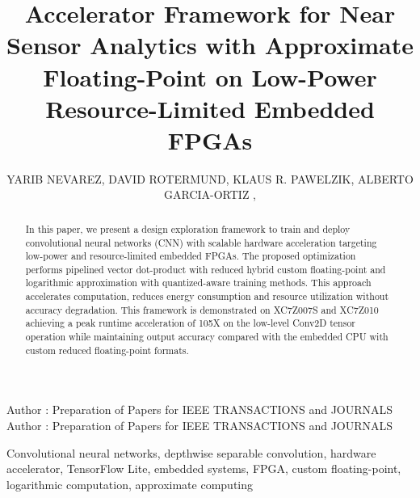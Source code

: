 \title {Accelerator Framework for Near Sensor Analytics with Approximate Floating-Point on Low-Power Resource-Limited Embedded FPGAs}

\author{
	\uppercase{Yarib Nevarez},	
	\uppercase{David Rotermund},
	\uppercase{Klaus R. Pawelzik},
	\uppercase{Alberto Garcia-Ortiz} ,
}

\address[1]{Institute of Electrodynamics and Microelectronics, University of Bremen, Bremen 28359, Germany (e-mail: nevarez@item.uni-bremen.de)}

\address[2]{Institute for Theoretical Physics, University of Bremen, Bremen 28359, Germany (e-mail: davrot@neuro.uni-bremen.de)}

\address[3]{Institute for Theoretical Physics, University of Bremen, Bremen 28359, Germany (e-mail: pawelzik@neuro.uni-bremen.de)}

\address[4]{Institute of Electrodynamics and Microelectronics, University of Bremen, Bremen 28359, Germany (e-mail: agarcia@item.uni-bremen.de)}


\markboth
{Author \headeretal: Preparation of Papers for IEEE TRANSACTIONS and JOURNALS}
{Author \headeretal: Preparation of Papers for IEEE TRANSACTIONS and JOURNALS}


\begin{abstract}
In this paper, we present a design exploration framework to train and deploy convolutional neural networks (CNN) with scalable hardware acceleration targeting low-power and resource-limited embedded FPGAs. The proposed optimization performs pipelined vector dot-product with reduced hybrid custom floating-point and logarithmic approximation with quantized-aware training methods. This approach accelerates computation, reduces energy consumption and resource utilization without accuracy degradation. This framework is demonstrated on XC7Z007S and  XC7Z010 achieving a peak runtime acceleration of 105X on the low-level Conv2D tensor operation while maintaining output accuracy compared with the embedded CPU with custom reduced floating-point formats.	
\end{abstract}

\begin{keywords}
Convolutional neural networks, depthwise separable convolution, hardware accelerator, TensorFlow Lite, embedded systems, FPGA, custom floating-point, logarithmic computation, approximate computing
\end{keywords}

\titlepgskip=-15pt

\maketitle